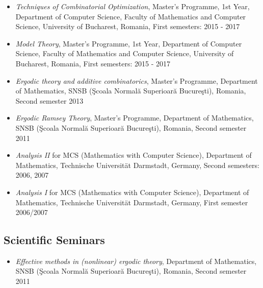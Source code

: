 \documentclass[12pt]{article}
\begin{document}
\begin{itemize}
\item {\it Techniques of Combinatorial Optimization}, Master's Programme, 1st Year, Department of Computer Science, Faculty of Mathematics and Computer Science, University of Bucharest, Romania, First semesters: 2015 - 2017

\item {\it Model Theory}, Master's Programme, 1st Year, Department of Computer Science, Faculty of Mathematics and Computer Science, University of Bucharest, Romania, First semesters: 2015 - 2017

\item {\it Ergodic theory and additive combinatorics},  Master's Programme, Department of Mathematics, SNSB (Şcoala Normală Superioară Bucureşti), Romania, Second semester 2013

\item {\it Ergodic Ramsey Theory},  Master's Programme, Department of Mathematics, SNSB (Şcoala Normală Superioară Bucureşti), Romania, Second semester 2011

\item {\em Analysis II} for MCS (Mathematics with Computer Science), Department of Mathematics, Technische Universit\" at Darmstadt, Germany,
Second semesters:  2006, 2007

\item {\em Analysis I} for MCS (Mathematics with Computer Science), Department of Mathematics, 
Technische Universit\" at Darmstadt, Germany, First semester  2006/2007

\end{itemize}

\subsection*{Scientific Seminars}

\begin{itemize}
\item {\it Effective methods in (nonlinear) ergodic theory}, Department of Mathematics, 
SNSB (\c Scoala Normal\u a Superioar\u a Bucure\c sti),  Romania, Second semester 2011
\end{itemize}
\end{document}
